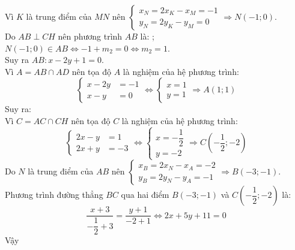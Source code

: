 \begin{vd}
{\[		\]
		Vì $K$ là trung điểm của $MN$ nên $\begin{cases}
		x_N=2x_K-x_M=-1\\y_N=2y_K-y_M=0
		\end{cases}\Rightarrow N(-1;0)$.\\
		Do $AB\perp CH$ nên phương trình $AB$ là: ;\\
		$N(-1;0)\in AB\Leftrightarrow -1+m_2=0\Leftrightarrow m_2=1$.\\
		Suy ra $AB\colon x-2y+1=0$.\\
		Vì $A=AB\cap AD$ nên tọa độ $A$ là nghiệm của hệ phương trình:
		\[\begin{cases}
		x-2y&=-1\\x-y&=0
		\end{cases}
		\Leftrightarrow \begin{cases}
		x=1\\y=1
		\end{cases}\Rightarrow A(1;1)
		\]
		Suy ra: \\
		Vì $C=AC \cap CH$ nên tọa độ $C$ là nghiệm của hệ phương trình:
		\[\begin{cases}
		2x-y&=1\\2x+y&=-3
		\end{cases}\Leftrightarrow\begin{cases}
		x=-\dfrac{1}{2}\\
		y=-2
		\end{cases}
		\Rightarrow C\left(-\dfrac{1}{2};-2\right)
		\]
		Do $N$ là trung điểm của $AB$ nên $\begin{cases}
		x_B=2x_N-x_A=-2\\y_B=2y_N-y_A=-1
		\end{cases}\Rightarrow B(-3;-1)$.\\
		Phương trình đường thẳng $BC$ qua hai điểm $B(-3;-1)$ và $C\left(-\dfrac{1}{2};-2\right)$ là:
		\[\dfrac{x+3}{-\dfrac{1}{2}+3}=\dfrac{y+1}{-2+1}\Leftrightarrow 2x+5y+11=0\]
		Vậy 
	}
\end{vd}

